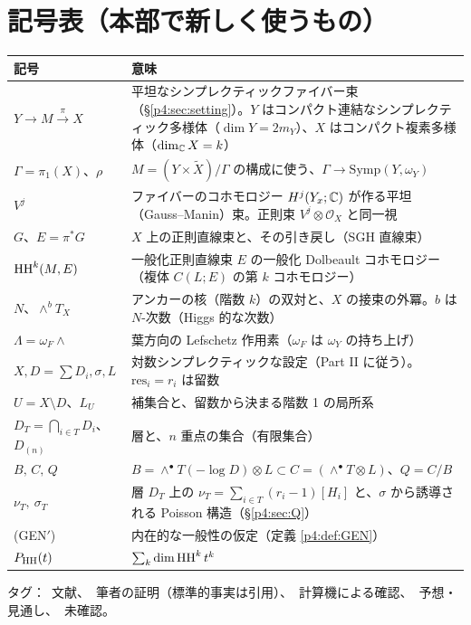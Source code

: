 \section{記号表（本部で新しく使うもの）}\label{p4:sec:notation}
\begin{longtable}{>{\raggedright\arraybackslash}p{3.8cm}>{\raggedright\arraybackslash}p{11.2cm}}
\toprule 記号 & 意味\\ \midrule\endhead
$Y\to M\xrightarrow{\pi} X$ & 平坦なシンプレクティックファイバー束（\S\ref{p4:sec:setting}）。$Y$ はコンパクト連結なシンプレクティック多様体（$\dim Y=2m_Y$）、$X$ はコンパクト複素多様体（$\dim_\mathbb C X=k$）\\
$\Gamma=\pi_1(X)$、$\rho$ & $M=(Y\times\tilde X)/\Gamma$ の構成に使う、$\Gamma\to\mathrm{Symp}(Y,\omega_Y)$\\
$V^j$ & ファイバーのコホモロジー $H^j(Y_x;\mathbb C)$ が作る平坦（Gauss--Manin）束。正則束 $V^j\otimes\mathcal O_X$ と同一視\\
$G$、$E=\pi^*G$ & $X$ 上の正則直線束と、その引き戻し（SGH 直線束）\\
$\mathrm{HH}^k(M,E)$ & 一般化正則直線束 $E$ の一般化 Dolbeault コホモロジー（複体 $C(L;E)$ の第 $k$ コホモロジー）\\
$N$、$\wedge^bT_X$ & アンカーの核（階数 $k$）の双対と、$X$ の接束の外冪。$b$ は $N$-次数（Higgs 的な次数）\\
$\Lambda=\omega_F\wedge$ & 葉方向の Lefschetz 作用素（$\omega_F$ は $\omega_Y$ の持ち上げ）\\
$X,D=\sum D_i,\sigma,L$ & 対数シンプレクティックな設定（Part II に従う）。$\mathrm{res}_i=r_i$ は留数\\
$U=X\setminus D$、$L_U$ & 補集合と、留数から決まる階数 1 の局所系\\
$D_T=\bigcap_{i\in T}D_i$、$D_{(n)}$ & 層と、$n$ 重点の集合（有限集合）\\
$B,\,C,\,Q$ & $B=\wedge^\bullet T(-\log D)\otimes L\subset C=(\wedge^\bullet T\otimes L)$、$Q=C/B$\\
$\nu_T,\ \sigma_T$ & 層 $D_T$ 上の $\nu_T=\sum_{i\in T}(r_i-1)[H_i]$ と、$\sigma$ から誘導される Poisson 構造（\S\ref{p4:sec:Q}）\\
(GEN$'$) & 内在的な一般性の仮定（定義 \ref{p4:def:GEN}）\\
$P_{\mathrm{HH}}(t)$ & $\sum_k\dim\mathrm{HH}^k\,t^k$\\
\bottomrule
\end{longtable}
\noindent タグ：\tC\ 文献、\tP\ 筆者の証明（標準的事実は引用）、\tV\ 計算機による確認、\tK\ 予想・見通し、\tQ\ 未確認。

